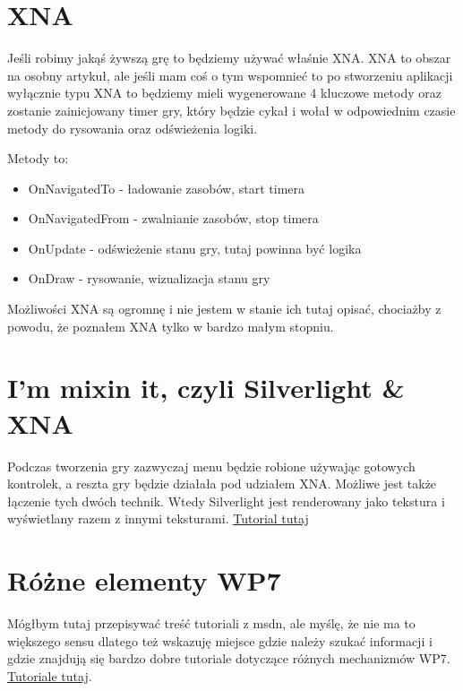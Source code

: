 \documentclass[12pt, a4paper]{article}
\begin{document}
\section{XNA}
Jeśli robimy jakąś żywszą grę to będziemy używać właśnie XNA. XNA to obszar na
osobny artykuł, ale jeśli mam coś o tym wspomnieć to po stworzeniu aplikacji
wyłącznie typu XNA to będziemy mieli wygenerowane 4 kluczowe metody oraz
zostanie zainicjowany timer gry, który będzie cykał i wołał w odpowiednim czasie
metody do rysowania oraz odświeżenia logiki.

Metody to:
\begin{itemize}
  \item OnNavigatedTo - ładowanie zasobów, start timera
  \item OnNavigatedFrom - zwalnianie zasobów, stop timera
  \item OnUpdate - odświeżenie stanu gry, tutaj powinna być logika
  \item OnDraw - rysowanie, wizualizacja stanu gry
\end{itemize}

Możliwości XNA są ogromnę i nie jestem w stanie ich tutaj opisać, chociażby z
powodu, że poznałem XNA tylko w bardzo małym stopniu.

\section{I'm mixin it, czyli Silverlight \& XNA}
Podczas tworzenia gry zazwyczaj menu będzie robione używając gotowych
kontrolek, a reszta gry będzie działała pod udziałem XNA.
Możliwe jest także łączenie tych dwóch technik. Wtedy Silverlight jest renderowany jako tekstura i
wyświetlany razem z innymi teksturami. 
\href{http://msdn.microsoft.com/en-us/library/hh202938%28v=vs.92%29}{Tutorial
 tutaj}

\section{Różne elementy WP7}
Mógłbym tutaj przepisywać treść tutoriali z msdn, ale myślę, że nie ma to
większego sensu dlatego też wskazuję miejsce gdzie należy szukać informacji i
gdzie znajdują się bardzo dobre tutoriale dotyczące różnych mechanizmów WP7.
\href{http://msdn.microsoft.com/en-us/library/ff431744%28v=vs.92%29.aspx}{Tutoriale
 tutaj}.
\end{document}
